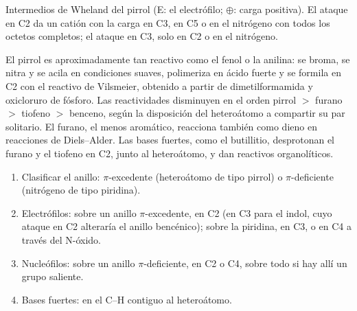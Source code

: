 \begin{omfigure}

{\small Intermedios de Wheland del pirrol (E: el electrófilo; $\oplus$: carga positiva).
El ataque en C2 da un catión con la carga en C3, en C5 o en el nitrógeno con todos los
octetos completos; el ataque en C3, solo en C2 o en el nitrógeno.}
\end{omfigure}

El pirrol es aproximadamente tan reactivo como el fenol o la anilina: se broma, se nitra
y se acila en condiciones suaves, polimeriza en ácido fuerte y se
formila en C2 con el reactivo de Vilsmeier, obtenido a partir de dimetilformamida y oxicloruro de
fósforo. Las reactividades disminuyen en el orden pirrol $>$ furano $>$ tiofeno $>$ benceno,
según la disposición del heteroátomo a compartir su par solitario. El furano,
el menos aromático, reacciona también como dieno en reacciones de Diels--Alder. Las bases
fuertes, como el butillitio, desprotonan el furano y el tiofeno en C2, junto al
heteroátomo, y dan reactivos organolíticos.

\begin{method}\label{met:b3:heterocycles:site}
\begin{enumerate}
  \item Clasificar el anillo: $\pi$-excedente (heteroátomo de tipo pirrol) o $\pi$-deficiente
        (nitrógeno de tipo piridina).
  \item Electrófilos: sobre un anillo $\pi$-excedente, en C2 (en C3 para el indol, cuyo ataque en C2
        alteraría el anillo bencénico); sobre la piridina, en C3, o en C4 a través del
        N-óxido.
  \item Nucleófilos: sobre un anillo $\pi$-deficiente, en C2 o C4, sobre todo si hay allí un grupo
        saliente.
  \item Bases fuertes: en el C--H contiguo al heteroátomo.
\end{enumerate}
\end{method}

